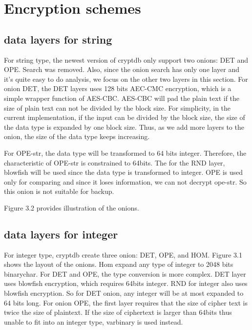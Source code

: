 \section{Encryption schemes}


\subsection{data layers for string}

For string type, the newest version of cryptdb only support two onions: DET and OPE. Search was removed. Also, since the onion search has only one layer and it's quite easy to do analysis, we focus on the other two layers
in this section. For onion DET, the DET layers uses 128 bits AEC-CMC encryption, which is a simple wrapper function of AES-CBC. AES-CBC will pad the plain text if the size of plain text can not be divided by the block size. For simplicity, in the current implementation, if the input can be divided by the block size, the size of the data type is expanded by one block size. Thus, as we add more layers to the onion, the size of the data type keeps increasing. 

For OPE-str, the data type will be transformed to 64 bits integer. Therefore, the characteristic of OPE-str is constrained to 64bits. The for the RND layer, blowfish will be used since the data type is transformed to integer. OPE is used only for comparing and since it loses information, we can not decrypt ope-str. So this onion is not suitable for backup. 

Figure 3.2 provides illustration of the onions. 



\subsection{data layers for integer}

For integer type, cryptdb create three onion: DET, OPE, and HOM. Figure 3.1 shows the layout of the onions. Hom expand any type of integer to 2048 bits binarychar. For DET and OPE, the type conversion is more complex. DET layer uses blowfish encryption, which requires 64bits integer. RND for integer also uses blowfish encryption. So for DET onion, any integer will be at most expanded to 64 bits long. For onion OPE, the first layer requires that the size of cipher text is twice the size of plaintext. If the size of ciphertext is larger than 64bits thus unable to fit into an integer type, varbinary is used instead. 



